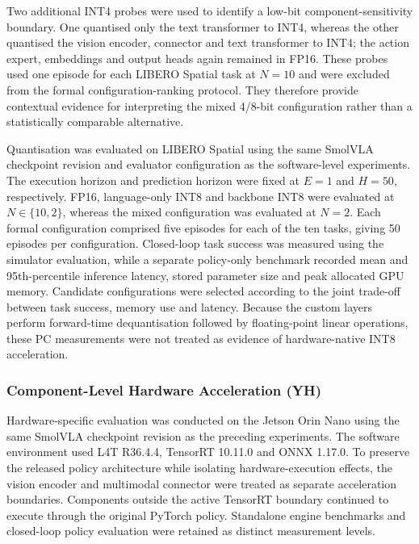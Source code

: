 Two additional INT4 probes were used to identify a low-bit component-sensitivity boundary. One quantised only the text transformer to INT4, whereas the other quantised the vision encoder, connector and text transformer to INT4; the action expert, embeddings and output heads again remained in FP16. These probes used one episode for each LIBERO Spatial task at \(N=10\) and were excluded from the formal configuration-ranking protocol. They therefore provide contextual evidence for interpreting the mixed 4/8-bit configuration rather than a statistically comparable alternative.

Quantisation was evaluated on LIBERO Spatial using the same SmolVLA checkpoint revision and evaluator configuration as the software-level experiments. The execution horizon and prediction horizon were fixed at \(E=1\) and \(H=50\), respectively. FP16, language-only INT8 and backbone INT8 were evaluated at \(N\in\{10,2\}\), whereas the mixed configuration was evaluated at \(N=2\). Each formal configuration comprised five episodes for each of the ten tasks, giving 50 episodes per configuration. Closed-loop task success was measured using the simulator evaluation, while a separate policy-only benchmark recorded mean and 95th-percentile inference latency, stored parameter size and peak allocated GPU memory. Candidate configurations were selected according to the joint trade-off between task success, memory use and latency. Because the custom layers perform forward-time dequantisation followed by floating-point linear operations, these PC measurements were not treated as evidence of hardware-native INT8 acceleration.


\subsubsection{Component-Level Hardware Acceleration (YH)}

Hardware-specific evaluation was conducted on the Jetson Orin Nano using the
same SmolVLA checkpoint revision as the preceding experiments. The software
environment used L4T R36.4.4, TensorRT 10.11.0 and ONNX 1.17.0. To preserve
the released policy architecture while isolating hardware-execution effects,
the vision encoder and multimodal connector were treated as separate
acceleration boundaries. Components outside the active TensorRT boundary
continued to execute through the original PyTorch policy. Standalone engine
benchmarks and closed-loop policy evaluation were retained as distinct
measurement levels.

